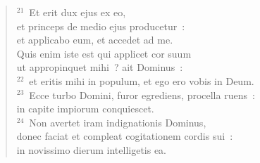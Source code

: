 \begin{flushleft}
\begin{verse}
${}^{21}$~Et erit dux ejus ex eo,\\ et princeps de medio ejus producetur~:\\ et applicabo eum, et accedet ad me.\\ Quis enim iste est qui applicet cor suum\\ ut appropinquet mihi~? ait Dominus~:\\
${}^{22}$~et eritis mihi in populum, et ego ero vobis in Deum.\\
${}^{23}$~Ecce turbo Domini, furor egrediens, procella ruens~:\\ in capite impiorum conquiescet.\\
${}^{24}$~Non avertet iram indignationis Dominus,\\ donec faciat et compleat cogitationem cordis sui~:\\ in novissimo dierum intelligetis ea.\end{verse}\end{flushleft}


